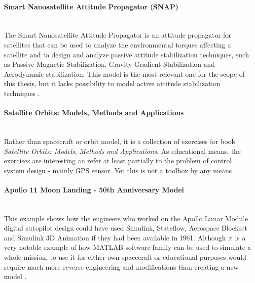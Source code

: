         \paragraph*{Smart Nanosatellite Attitude Propagator (SNAP)}\hspace{0pt}\\[0.1cm]
            The Smart Nanosatellite Attitude Propagator is an attitude propagator for satellites that can be used to analyze the environmental torques affecting a satellite and to design and analyze passive attitude stabilization techniques, such as Passive Magnetic Stabilization, Gravity Gradient Stabilization and Aerodynamic stabilization. This model is the most relevant one for the scope of this thesis, but it lacks possibility to model active attitude stabilization techniques \cite{snap}.

        \paragraph*{Satellite Orbits: Models, Methods and Applications}\hspace{0pt}\\[0.1cm]
            Rather than spacecraft or orbit model, it is a collection of exercises for book \textit{Satellite Orbits: Models, Methods and Applications}. As educational means, the exercises are interesting an refer at least partially to the problem of control system design - mainly GPS sensor. Yet this is not a toolbox by any means \cite{orbitsaddon}.
        
        \paragraph*{Apollo 11 Moon Landing - 50th Anniversary Model}\hspace{0pt}\\[0.1cm]
            This example shows how the engineers who worked on the Apollo Lunar Module digital autopilot design could have used Simulink, Stateflow, Aerospace Blockset and Simulink 3D Animation if they had been available in 1961. Although it is a very notable example of how MATLAB software family can be used to simulate a whole mission, to use it for either own spacecraft or educational purposes would require much more reverse engineering and modifications than creating a new model \cite{apollo}. 

